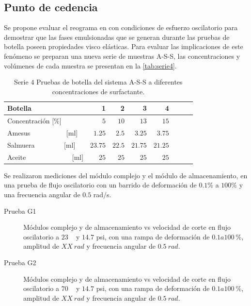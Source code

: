 \subsection*{Punto de cedencia}

Se propone evaluar el reograma en con condiciones de esfuerzo oscilatorio para demostrar que las fases emulsionadas que se generan durante las pruebas de botella poseen propiedades visco elásticas. Para evaluar las implicaciones de este fenómeno se preparan una nueva serie de muestras A-S-S, las concentraciones y volúmenes de cada muestra se presentan en la \autoref{tab:serie4}.

 \begin{table}[H]
    \caption[Pruebas de botella]{Serie $4$ Pruebas de botella del sistema A-S-S a diferentes concentraciones de surfactante.}
    \centering \footnotesize
    \begin{tabulary}{1.1\textwidth}{L |R|R|R|R|R|R|R}
        \toprule
        Botella & \textbf{1} & \textbf{2} & \textbf{3} & \textbf{4}  \\
        \midrule
        Concentración [\%] & $5$  & $10$ & $13$  & $15$  \\
        Amesus ~~~~~~~~~~[ml] & $1.25$  & $2.5$ & $3.25$ & $3.75$  \\
        Salmuera ~~~~~~~~[ml] & $23.75$ & $22.5$ & $21.75$ & $21.25$  \\
        Aceite ~~~~~~~~~~~~~[ml] & $25$ & $25$ & $25$ & $25$  \\
        \midrule
        \bottomrule
    \end{tabulary}
    \label{tab:serie4}
\end{table}

Se realizaron mediciones del módulo complejo y el módulo de almacenamiento, en una prueba de flujo oscilatorio con un barrido de deformación de $0.1$\% a $100$\% y una frecuencia angular de $0.5$ rad/s.

\begin{description}
    \item [Prueba G1] Módulos complejo y de almacenamiento vs velocidad de corte en flujo oscilatorio a $23$ \celsius~ y $14.7$ psi, con una rampa de deformación de $0.1 a 100~ \%$, amplitud de $XX~rad$ y frecuencia angular de $0.5~rad$.
    \item [Prueba G2] Módulos complejo y de almacenamiento vs velocidad de corte en flujo oscilatorio a $70$ \celsius~ y $14.7$ psi, con una rampa de deformación de $0.1 a 100~ \%$, amplitud de $XX~rad$ y frecuencia angular de $0.5~rad$.
\end{description}


